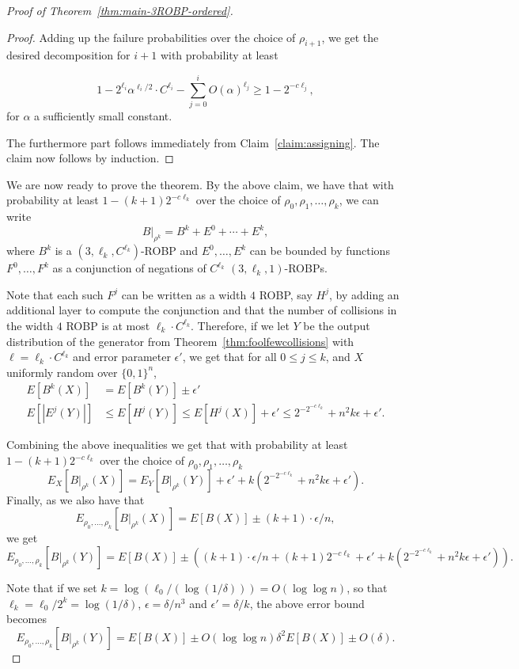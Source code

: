 \begin{proof}[Proof of Theorem~\ref{thm:main-3ROBP-ordered}]
\begin{proof}
Adding up the failure probabilities over the choice of $\rho_{i+1}$, we get the desired decomposition for $i+1$ with probability at least 

$$1 - 2^{\ell_i} \alpha^{\ell_i/2} \cdot C^{\ell_i} - \sum_{j=0}^i O(\alpha)^{\ell_j} \geq 1 - 2^{-c \ell_j},$$
for $\alpha$ a sufficiently small constant. 


The furthermore part follows immediately from Claim~\ref{claim:assigning}. The claim now follows by induction. 
\end{proof}

We are now ready to prove the theorem. By the above claim, we have that with probability at least $1 - (k+1) 2^{-c \ell_k}$ over the choice of $\rho_0, \rho_1,\ldots,\rho_k$, we can write
$$B|_{\rho^k} = B^k + E^0 + \cdots + E^k,$$
where $B^k$ is a $(3, \ell_k,C^{\ell_k})$-ROBP and $E^0,\ldots,E^k$ can be bounded by functions $F^0,\ldots,F^k$ as a conjunction of negations of $C^{\ell_k}$ $(3,\ell_k,1)$-ROBPs. 

Note that each such $F^j$ can be written as a width $4$ ROBP, say $H^j$, by adding an additional layer to compute the conjunction and that the number of collisions in the width $4$ ROBP is at most $\ell_k \cdot C^{\ell_k}$. Therefore, if we let $Y$ be the output distribution of the generator from Theorem~\ref{thm:foolfewcollisions} with $\ell = \ell_k \cdot C^{\ell_k}$ and error parameter $\epsilon'$, we get that for all $0 \leq j \leq k$, and $X$ uniformly random over $\{0,1\}^n$, 
\begin{align*}
E[B^k(X)] &= E[B^k(Y)] \pm \epsilon'\\
E[|E^j(Y)|] &\leq E[H^j(Y)] \leq E[H^j(X)] + \epsilon' \leq 2^{-2^{-c\ell_k}} + n^2 k \epsilon + \epsilon'.
\end{align*}

Combining the above inequalities we get that with probability at least $1 - (k+1) 2^{-c \ell_k}$ over the choice of $\rho_0, \rho_1,\ldots,\rho_k$
$$E_X [B|_{\rho^k}(X)] = E_Y [B|_{\rho^k}(Y)] + \epsilon' + k(2^{-2^{-c\ell_k}} + n^2 k \epsilon + \epsilon').$$
Finally, as we also have that 
$$E_{\rho_0,\ldots,\rho_k}[ B|_{\rho^k}(X)] = E[B(X)] \pm (k+1) \cdot \epsilon/n,$$
we get
$$E_{\rho_0,\ldots,\rho_k}[B|_{\rho^k}(Y)] = E[B(X)] \pm \left( (k+1) \cdot \epsilon/n + (k+1) 2^{-c \ell_k} + \epsilon' + k(2^{-2^{-c\ell_k}} + n^2 k \epsilon + \epsilon')\right).$$

Note that if we set $k = \log(\ell_0/(\log(1/\delta))) = O(\log \log n)$, so that $\ell_k = \ell_0/2^k = \log(1/\delta)$, $\epsilon = \delta/n^3$ and $\epsilon' = \delta/k$, the above error bound becomes
$$E_{\rho_0,\ldots,\rho_k}[B|_{\rho^k}(Y)] = E[B(X)] \pm O(\log \log n) \delta^2 E[B(X)] \pm O(\delta).$$


\end{proof}
